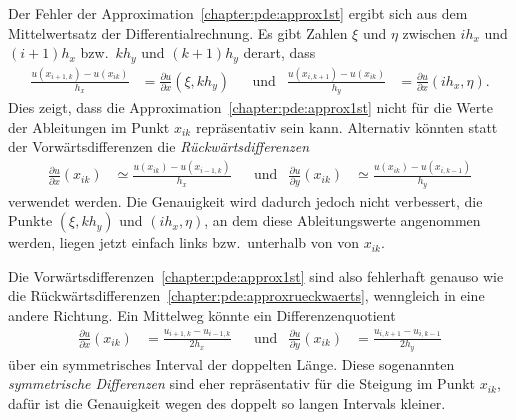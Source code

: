 Der Fehler der Approximation~\eqref{chapter:pde:approx1st} ergibt sich
aus dem Mittelwertsatz der Differentialrechnung.
Es gibt Zahlen $\xi$ und $\eta$ zwischen $ih_x$ und $(i+1)h_x$
bzw.~$kh_y$ und $(k+1)h_y$ derart, dass
\begin{align*}
\frac{u(x_{i+1,k}) - u(x_{ik})}{h_x}
&=
\frac{\partial u}{\partial x}(\xi, kh_y)
&
&\text{und}
&
\frac{u(x_{i,k+1}) - u(x_{ik})}{h_y}
&=
\frac{\partial u}{\partial x}(ih_x, \eta).
\end{align*}
Dies zeigt, dass die Approximation~\eqref{chapter:pde:approx1st}
nicht für die Werte der Ableitungen im Punkt $x_{ik}$ repräsentativ 
sein kann.
Alternativ könnten statt der Vorwärtsdifferenzen die {\em Rückwärtsdifferenzen}
\begin{align}
\frac{\partial u}{\partial x} (x_{ik}) 
&\simeq
\frac{u(x_{ik}) - u(x_{i-1,k})}{h_x}
&
&\text{und}
&
\frac{\partial u}{\partial y} (x_{ik}) 
&\simeq
\frac{u(x_{ik}) - u(x_{i,k-1})}{h_y}
\label{chapter:pde:approxrueckwaerts}
\end{align}
verwendet werden.
Die Genauigkeit wird dadurch jedoch nicht verbessert, die Punkte
$(\xi,kh_y)$ und $(ih_x,\eta)$, an dem diese Ableitungswerte angenommen
werden, liegen jetzt einfach links bzw.~unterhalb von von $x_{ik}$.

Die Vorwärtsdifferenzen~\eqref{chapter:pde:approx1st} sind also
fehlerhaft genauso wie
die Rückwärtsdifferenzen~\eqref{chapter:pde:approxrueckwaerts},
wenngleich in eine andere Richtung.
Ein Mittelweg könnte ein Differenzenquotient
\begin{align*}
\frac{\partial u}{\partial x}(x_{ik})
&=
\frac{u_{i+1,k}-u_{i-1,k}}{2h_x}
&&\text{und}
&
\frac{\partial u}{\partial y}(x_{ik})
&=
\frac{u_{i,k+1}-u_{i,k-1}}{2h_y}
\end{align*}
über ein symmetrisches Interval der doppelten Länge.
%
Diese sogenannten {\em symmetrische Differenzen} sind eher repräsentativ
für die Steigung im Punkt $x_{ik}$, dafür ist die Genauigkeit wegen des
doppelt so langen Intervals kleiner.

